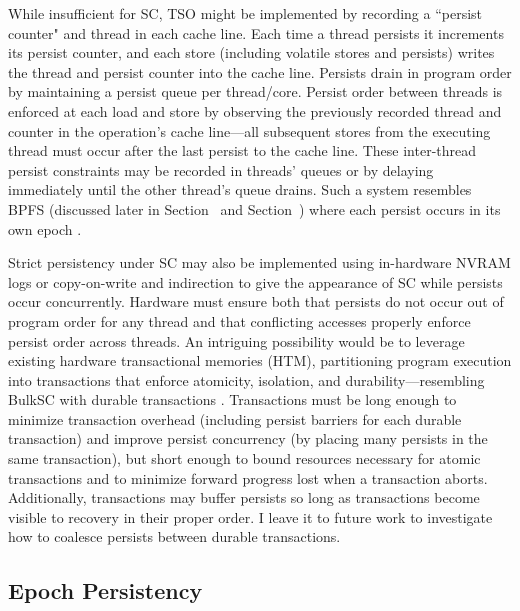 While insufficient for SC, TSO might be implemented by recording a ``persist counter" and thread in each cache line.
Each time a thread persists it increments its persist counter, and each store (including volatile stores and persists) writes the thread and persist counter into the cache line.
Persists drain in program order by maintaining a persist queue per thread/core.
Persist order between threads is enforced at each load and store by observing the previously recorded thread and counter in the operation's cache line---all subsequent stores from the executing thread must occur after the last persist to the cache line.
These inter-thread persist constraints may be recorded in threads' queues or by delaying immediately until the other thread's queue drains.
Such a system resembles BPFS (discussed later in Section~ and Section~) where each persist occurs in its own epoch \cite{ConditNightingale09}.

Strict persistency under SC may also be implemented using in-hardware NVRAM logs or copy-on-write and indirection to give the appearance of SC while persists occur concurrently.
Hardware must ensure both that persists do not occur out of program order for any thread and that conflicting accesses properly enforce persist order across threads.
An intriguing possibility would be to leverage existing hardware transactional memories (HTM), partitioning program execution into transactions that enforce atomicity, isolation, and durability---resembling BulkSC with durable transactions .
Transactions must be long enough to minimize transaction overhead (including persist barriers for each durable transaction) and improve persist concurrency (by placing many persists in the same transaction), but short enough to bound resources necessary for atomic transactions and to minimize forward progress lost when a transaction aborts.
Additionally, transactions may buffer persists so long as transactions become visible to recovery in their proper order.
I leave it to future work to investigate how to coalesce persists between durable transactions.

\subsection{Epoch Persistency}
\label{section:PersistencyModels:PersistEpochs}

